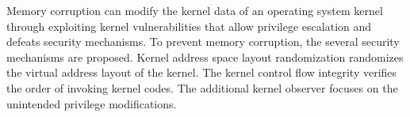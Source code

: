   Memory corruption can modify the kernel data of an operating system kernel
  through exploiting kernel vulnerabilities that allow privilege escalation and
  defeats security mechanisms.
  To prevent memory corruption, the several security mechanisms are proposed.
  Kernel address space layout randomization randomizes the virtual address
  layout of the kernel.
  The kernel control flow integrity verifies the order of invoking kernel codes.
  The additional kernel observer focuses on the unintended privilege
  modifications.
